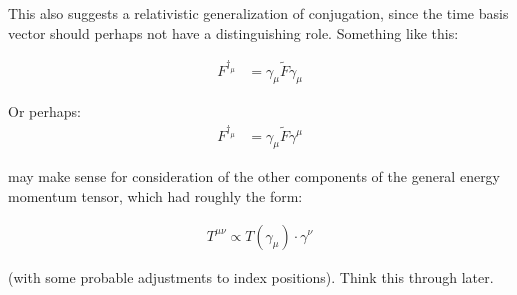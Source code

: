 This also suggests a relativistic generalization of conjugation, since the time basis vector should perhaps not have
a distinguishing role.  Something like this:

\begin{align*}
F^{\dagger_\mu} &= \gamma_\mu \tilde{F} \gamma_\mu
\end{align*}

Or perhaps:
\begin{align*}
F^{\dagger_\mu} &= \gamma_\mu \tilde{F} \gamma^\mu
\end{align*}

may make sense for consideration of the other components of the general energy momentum tensor, which had roughly the form:

\begin{align*}
T^{\mu\nu} \propto T(\gamma_\mu) \cdot \gamma^\nu
\end{align*}

(with some probable adjustments to index positions).  Think this through later.
